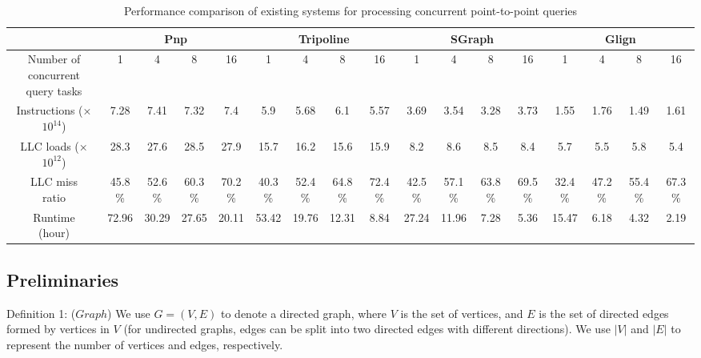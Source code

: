 \documentclass[lettersize,journal]{IEEEtran} %
\begin{document}
\begin{table}
  \centering
  \renewcommand\arraystretch{1.5}
  \tabcolsep=0.02cm
  \tiny
  
  \begin{tabular}{|c|c|c|c|c|c|c|c|c|c|c|c|c|c|c|c|c|}
    \hline
    \rule{0pt}{8pt} 
    \multirow{1}{*}{System} & \multicolumn{4}{c|}{Pnp} & \multicolumn{4}{c|}{Tripoline} & \multicolumn{4}{c|}{SGraph} & \multicolumn{4}{c|}{Glign} \\
    \hline
    \rule{0pt}{11pt} 
    \makecell{Number of \\ concurrent \\ query tasks} & 1 & 4 & 8 & 16  & 1 & 4 & 8 & 16 & 1 & 4 & 8 & 16 & 1 & 4 & 8 & 16 \\
    \hline
    \rule{0pt}{9pt} 
    \makecell{Instructions \\ (×$10^{14}$)} & 7.28 & 7.41 & 7.32 & 7.4 & 5.9 & 5.68 & 6.1 & 5.57 & 3.69 & 3.54 & 3.28 & 3.73 & 1.55 & 1.76 & 1.49 & 1.61 \\
    \hline
    \rule{0pt}{9pt} 
    \makecell{LLC loads \\ (×$10^{12}$)} & 28.3 & 27.6 & 28.5 & 27.9 & 15.7 & 16.2 & 15.6 & 15.9 & 8.2 & 8.6 & 8.5 & 8.4 & 5.7 & 5.5 & 5.8 & 5.4 \\
    \hline
    \rule{0pt}{9pt} 
    \makecell{LLC miss \\ ratio} & 45.8\% & 52.6\% & 60.3\% & 70.2\% & 40.3\% & 52.4\% & 64.8\% & 72.4\% & 42.5\% & 57.1\% & 63.8\% & 69.5\% & 32.4\% & 47.2\% & 55.4\% & 67.3\% \\
    \hline
    \rule{0pt}{9pt} 
    \makecell{Runtime \\ (hour)} & 72.96 & 30.29 & 27.65 & 20.11 & 53.42 & 19.76 & 12.31 & 8.84 & 27.24 & 11.96 & 7.28 & 5.36 & 15.47 & 6.18 & 4.32 & 2.19 \\
    \hline
  \end{tabular}
  \caption{Performance comparison of existing systems for processing concurrent point-to-point queries}
  \label{System_comparison}
\end{table}



\subsection{Preliminaries}
Definition 1: ($Graph$) We use $G=(V,E)$ to denote a directed graph, where $V$ is the set of vertices, and $E$ is the set of directed edges formed by vertices in $V$ (for undirected graphs, edges can be split into two directed edges with different directions). We use $|V|$ and $|E|$ to represent the number of vertices and edges, respectively.
\end{document}
